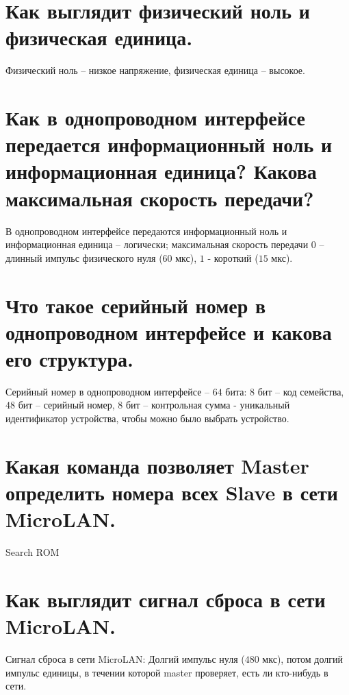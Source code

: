 \section{Как выглядит физический ноль и физическая единица.}

Физический ноль -- низкое напряжение, физическая единица -- высокое.

\section{Как в однопроводном интерфейсе передается информационный ноль и информационная единица? Какова максимальная скорость  передачи?}

В однопроводном интерфейсе передаются информационный ноль и информационная единица -- 
логически; максимальная скорость  передачи $0$ -- длинный импульс физического нуля ($60$ мкс),
$1$ - короткий ($15$ мкс).

\section{Что такое серийный номер в однопроводном интерфейсе и какова его структура.}

Серийный номер в однопроводном интерфейсе -- $64$ бита: $8$ бит -- код семейства, $48$ бит -- 
серийный номер, $8$ бит -- контрольная сумма - уникальный идентификатор устройства, 
чтобы можно было выбрать устройство.

\section{Какая команда позволяет Master определить номера всех Slave в сети MicroLAN.}

Search ROM

\section{Как выглядит сигнал сброса в сети MicroLAN.}

Сигнал сброса в сети MicroLAN: Долгий импульс нуля ($480$ мкс), потом долгий импульс единицы, 
в течении которой master проверяет, есть ли кто-нибудь в сети.
